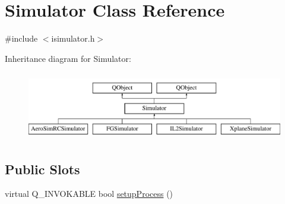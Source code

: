 \hypertarget{class_simulator}{\section{Simulator Class Reference}
\label{class_simulator}
}


{\ttfamily \#include $<$isimulator.\-h$>$}

Inheritance diagram for Simulator\-:\begin{figure}[H]
\begin{center}
\leavevmode
\includegraphics[height=3.000000cm]{class_simulator}
\end{center}
\end{figure}
\subsection*{Public Slots}
\begin{DoxyCompactItemize}
\item 
virtual Q\-\_\-\-I\-N\-V\-O\-K\-A\-B\-L\-E bool \hyperlink{group___h_i_t_l_plugin_ga25516220ab21d874ae00dd9a21c3e313}{setup\-Process} ()
\end{DoxyCompactItemize}
